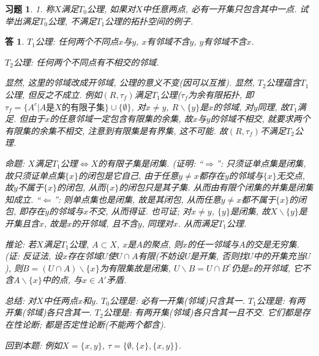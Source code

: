\documentclass{ctexart}%
\newtheorem*{exercise}{习题}
\newtheorem*{solution}{答}
\theoremstyle{definition}
\theoremstyle{remark}
\begin{document}
\begin{exercise}1. 称$X$满足$T_0$公理, 如果对$X$中任意两点, 必有一开集只包含其中一点. 试举出满足$T_0$公理, 不满足$T_1$公理的拓扑空间的例子.
\end{exercise}
\begin{solution}
$T_1$公理: 任何两个不同点$x$与$y$, $x$有邻域不含$y$, $y$有邻域不含$x$. 

$T_2$公理: 任何两个不同点有不相交的邻域. 

显然, 这里的邻域改成开邻域, 公理的意义不变(因可以互推). 显然, $T_2$公理蕴含$T_1$公理, 但反之不成立. 例如$(R,\tau_f)$满足$T_1$公理($\tau_f$为余有限拓扑, 即$\tau_f=\{A^c|A\text{是}X\text{的有限子集}\}\cup \{\emptyset\}$, 对$x\neq y$, $R\backslash \{y\}$是$x$的邻域, 对$y$同理, 故$T_1$满足. 但由于$x$的任意邻域一定包含有限集的余集, 故$x$与$y$的邻域不相交, 就要求两个有限集的余集不相交, 注意到有限集是有界集, 这不可能. 故$(R,\tau_f)$不满足$T_2$公理.  

命题: $X$满足$T_1$公理$\Longleftrightarrow X$的有限子集是闭集. (证明: ``$\Longrightarrow$'': 只须证单点集是闭集, 故只须证单点集$\{x\}$的闭包是它自己, 由于任意$y\neq x$都存在$y$的邻域与$\{x\}$无交点, 故$y$不属于$\{x\}$的闭包, 从而$\{x\}$的闭包只是其子集. 从而由有限个闭集的并集是闭集知成立. ``$\Longleftarrow$'': 则单点集也是闭集, 故是其闭包, 从而任意$y\neq x$都不属于$\{x\}$的闭包, 即存在$y$的邻域与$x$不交, 从而得证. 也可证; 对$x\neq y$, $\{y\}$是闭集, 故$X\backslash \{y\}$是开集且含$x$, 故是$x$的开邻域, 且不含$y$, 同理对$x$. 从而满足$T_1$公理. 

推论: 若$X$满足$T_1$公理, $A\subset X$, $x$是$A$的聚点, 则$x$的任一邻域与$A$的交是无穷集. (证: 反证法, 设$x$存在邻域$U$使$U\cap A$有限(不妨设$U$是开集, 否则找$U$中的开集充当$U$), 则$B=(U\cap A)\backslash\{x\}$为有限集故是闭集, $U\backslash B= U\cap B^c$仍是$x$的开邻域, 它不含$A\backslash\{x\}$中的点, 与$x\in A'$矛盾. 

总结: 对$X$中任两点$x$和$y$. $T_0$公理是: 必有一开集(邻域)只含其一. $T_1$公理是: 有两开集(邻域)各只含其一. $T_2$公理是: 有两开集(邻域)各只含其一且不交. 它们都是存在性论断; 都是否定性论断(不能两个都含).

回到本题: 例如$X=\{x,y\}$, $\tau=\{\emptyset, \{x\}, \{x,y\}\}$. 
\end{solution}
\end{document}
